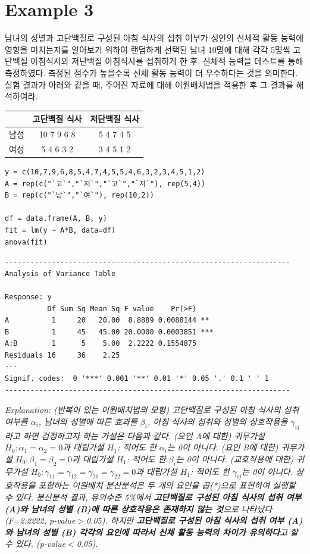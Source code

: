 \documentclass{article}
\begin{document}
\section*{Example 3}
남녀의 성별과 고단백질로 구성된 아침 식사의 섭취 여부가 성인의 신체적 활동
능력에 영향을 미치는지를 알아보기 위하여 랜덤하게 선택된 남녀 10명에 대해 각각 5명씩
고단백질 아침식사와 저단백질 아침식사를 섭취하게 한 후, 신체적 능력을 테스트를 통해
측정하였다. 측정된 점수가 높을수록 신체 활동 능력이 더 우수하다는 것을 의미한다. 실험
결과가 아래와 같을 때, 주어진 자료에 대해 이원배치법을 적용한 후 그 결과를 해석하여라.

\begin{table}[htb!]
\centering
\begin{tabularx}{0.4\textwidth}{@{\extracolsep{\fill}}c|cc} \hline
& 고단백질 식사 & 저단백질 식사 \\ \hline
남성 & 10 7 9 6 8 & 5 4 7 4 5 \\ \hline
여성 & 5 4 6 3 2 & 3 4 5 1 2  \\ \hline
\end{tabularx}
\end{table}

\begin{lstlisting}[style={r-style}]
y = c(10,7,9,6,8,5,4,7,4,5,5,4,6,3,2,3,4,5,1,2)
A = rep(c("`고`","`저`","`고`","`저`"), rep(5,4))
B = rep(c("`남`","`여`"), rep(10,2))

df = data.frame(A, B, y)
fit = lm(y ~ A*B, data=df)
anova(fit)
\end{lstlisting}
\begin{lstlisting}[style={out-style}]
-------------------------------------------------------------------         
Analysis of Variance Table

Response: y
          Df Sum Sq Mean Sq F value    Pr(>F)    
A          1     20   20.00  8.8889 0.0088144 ** 
B          1     45   45.00 20.0000 0.0003851 ***
A:B        1      5    5.00  2.2222 0.1554875    
Residuals 16     36    2.25
---
Signif. codes:  0 '***' 0.001 '**' 0.01 '*' 0.05 '.' 0.1 ' ' 1
-------------------------------------------------------------------
\end{lstlisting}
\emph{Explanation: (반복이 있는 이원배치법의 모형) 고단백질로 구성된 아침 식사의 섭취 여부를 $\alpha_i$, 남녀의 성별에 따른 효과를 $\beta_i$, 아침 식사의 섭취와 성별의 상호작용을 $\gamma_{ij}$ 라고 하면 검정하고자 하는 가설은 다음과 같다.
(요인 A에 대한) 귀무가설 $H_0: \alpha_1=\alpha_2=0$과 대립가설 $H_1$: 적어도 한 $\alpha_i$는 0이 아니다. (요인 B에 대한) 귀무가설 $H_0: \beta_1=\beta_2=0$과 대립가설 $H_1$: 적어도 한 $\beta_i$는 0이 아니다. (교호작용에 대한) 귀무가설 $H_0: \gamma_{11}=\gamma_{12}=\gamma_{21}=\gamma_{22}=0$과 대립가설 $H_1$: 적어도 한 $\gamma_{ij}$는 0이 아니다. 상호작용을 포함하는 이원배치 분산분석은 두 개의 요인을 곱(*)으로 표현하여 실행할 수 있다. 분산분석 결과, 유의수준 5\%에서 \textbf{고단백질로 구성된 아침 식사의 섭취 여부 (A)와 남녀의 성별 (B)에 따른 상호작용은 존재하지 않는 것}으로 나타났다 (F=2.2222, p-value$>$0.05). 
하지만 \textbf{고단백질로 구성된 아침 식사의 섭취 여부 (A)와 남녀의 성별 (B) 각각의 요인에 따라서 신체 활동 능력의 차이가 유의하다}고 할 수 있다. (p-value$<$0.05). } \\
\end{document}
